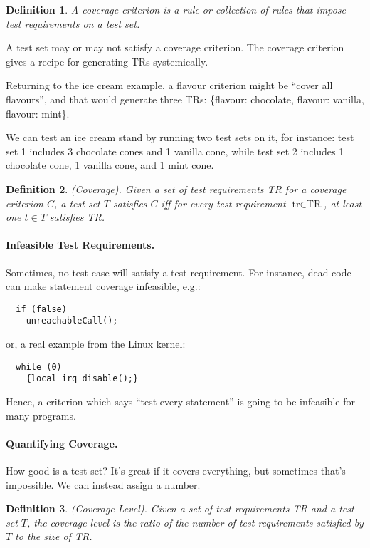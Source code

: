 \documentclass[11pt]{article}
\newtheorem{defn}{Definition}
\begin{document}
\begin{defn}
A \emph{coverage criterion} is a rule or collection of rules that impose
test requirements on a test set.
\end{defn}

A test set may or may not satisfy a coverage criterion. The coverage
criterion gives a recipe for generating TRs systemically.

Returning to the ice cream example, a flavour criterion might be
``cover all flavours'', and that would generate three TRs:
\{flavour: chocolate, flavour: vanilla, flavour: mint\}.

We can test an ice cream stand by running two test sets on it,
for instance: test set 1 includes 3 chocolate cones and 1 vanilla cone,
while test set 2 includes 1 chocolate cone, 1 vanilla cone, and 1
mint cone.

\begin{defn} 
(Coverage). Given a set of test requirements TR for a coverage criterion
$C$, a test set $T$ satisfies $C$ iff for every test requirement 
$\mbox{tr} \in \mbox{TR}$, at least one $t \in T$ satisfies TR.
\end{defn}



\paragraph{Infeasible Test Requirements.} Sometimes, no test case will 
satisfy a test requirement. For instance, dead code can make statement
coverage infeasible, e.g.:

\begin{verbatim}
  if (false)
    unreachableCall();
\end{verbatim}

or, a real example from the Linux kernel:
\begin{verbatim}
  while (0)
    {local_irq_disable();}
\end{verbatim}

Hence, a criterion which says ``test every statement'' is going to be
infeasible for many programs.

\paragraph{Quantifying Coverage.} How good is a test set? It's great if it
covers everything, but sometimes that's impossible.
We can instead assign a number.
\begin{defn}
(Coverage Level). Given a set of test requirements TR and a test set $T$,
the coverage level is the ratio of the number of test requirements
satisfied by $T$ to the size of TR.
\end{defn}
\end{document}

